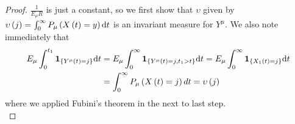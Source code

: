 \documentclass[12pt,a4paper]{scrartcl}
\numberwithin{equation}{section}
\begin{document}
\begin{proof}
$ \frac{1}{E_{\mu}R} $ is just a constant, so we first show that $ \upsilon $ given by $ \upsilon\left(j\right) =  \int_{0}^{\infty} P_{\mu}\left(X\left(t\right) = y\right) \textnormal{d} t $ is an invariant measure for $ Y^{\mu} $. We also note immediately that 
\begin{align*}
E_{\mu} \int_{0}^{t_1} \textbf{1}_{\lbrace Y^{\mu}\left(t\right) = j\rbrace } \textnormal{d}t &= E_{\mu} \int_{0}^{\infty} \textbf{1}_{\lbrace Y^{\mu}\left(t\right) = j, t_1 > t\rbrace } \textnormal{d}t = E_{\mu} \int_{0}^{\infty} \textbf{1}_{\lbrace X_1\left(t\right) = j\rbrace } \textnormal{d}t \\
&= \int_{0}^{\infty} P_{\mu} \left(X\left(t\right) = j\right) dt = \upsilon\left(j\right)
\end{align*}
where we applied Fubini's theorem in the next to last step.\\[2ex]


\end{proof}
\end{document}
